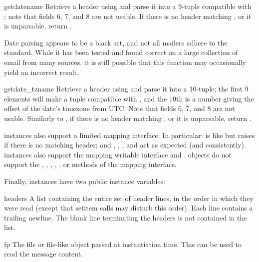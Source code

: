 \begin{methoddesc}{getdate}{name}
Retrieve a header using  and parse it into a 9-tuple
compatible with ; note that fields 6, 7, and 8 
are not usable.  If there is no header matching
, or it is unparsable, return .

Date parsing appears to be a black art, and not all mailers adhere to
the standard.  While it has been tested and found correct on a large
collection of email from many sources, it is still possible that this
function may occasionally yield an incorrect result.
\end{methoddesc}

\begin{methoddesc}{getdate_tz}{name}
Retrieve a header using  and parse it into a
10-tuple; the first 9 elements will make a tuple compatible with
, and the 10th is a number giving the offset
of the date's timezone from UTC.  Note that fields 6, 7, and 8 
are not usable.  Similarly to , if
there is no header matching , or it is unparsable, return
. 
\end{methoddesc}

 instances also support a limited mapping interface.
In particular:  is like
 but raises  if
there is no matching header; and ,
, ,
 and  act as expected
(and consistently).   instances also support the
mapping writable interface  and .   objects do not support the
, , , ,
, or  methods of the mapping
interface.

Finally,  instances have two public instance variables:

\begin{memberdesc}{headers}
A list containing the entire set of header lines, in the order in
which they were read (except that setitem calls may disturb this
order). Each line contains a trailing newline.  The
blank line terminating the headers is not contained in the list.
\end{memberdesc}

\begin{memberdesc}{fp}
The file or file-like object passed at instantiation time.  This can
be used to read the message content.
\end{memberdesc}


